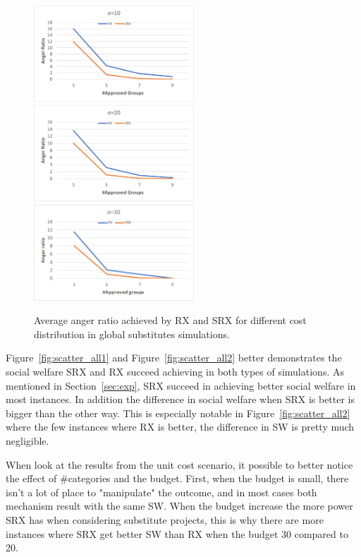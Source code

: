 \documentclass[runningheads]{llncs}
\begin{document}
\begin{subappendices}
\begin{figure}[t]
\begin{center}
\includegraphics[width=6cm]{simulation/constant_substitutes_ar_10.png}
\includegraphics[width=6cm]{simulation/constant_substitutes_ar_20.png}
\includegraphics[width=6cm]{simulation/constant_substitutes_ar_30.png}
\caption{Average anger ratio achieved by RX and SRX for different cost distribution in global substitutes simulations.
}\label{fig:ar_all2}
\end{center}
\end{figure}

Figure~\ref{fig:scatter_all1} and Figure~\ref{fig:scatter_all2} better demonstrates the social welfare SRX and RX succeed achieving in both types of simulations. As mentioned in Section~\ref{sec:exp}, SRX succeed in achieving better social welfare in most instances. In addition the difference in social welfare when SRX is better is bigger than the other way. This is especially notable in Figure~\ref{fig:scatter_all2} where the few instances where RX is better, the difference in SW is pretty much negligible.

When look at the results from the unit cost scenario, it possible to better notice the effect of \#categories and the budget. First, when the budget is small, there isn't a lot of place to "manipulate" the outcome, and in most cases both mechanism result with the same SW. When the budget increase the more power SRX has when considering substitute projects, this is why there are more instances where SRX get better SW than RX when the budget 30 compared to 20.


\end{subappendices}
\end{document}
